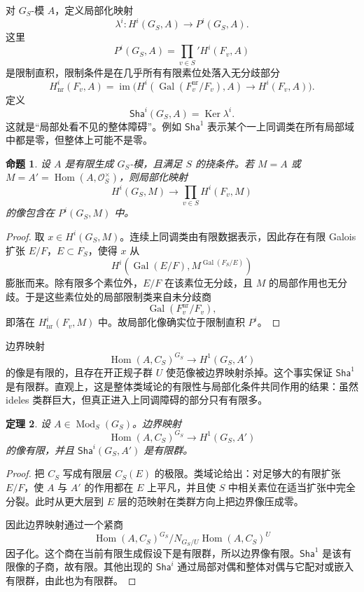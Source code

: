 \documentclass[11pt,a4paper,openany]{ctexbook}
\numberwithin{equation}{chapter}
\newcommand{\Gal}{\operatorname{Gal}}
\newcommand{\Hom}{\operatorname{Hom}}
\newcommand{\Ker}{\operatorname{Ker}}
\newcommand{\Sha}{\mathsf{Sha}}
\theoremstyle{plain}
\newtheorem{theorem}{定理}[chapter]
\newtheorem{proposition}[theorem]{命题}
\theoremstyle{definition}
\theoremstyle{remark}
\begin{document}
对 $G_S$-模 $A$，定义局部化映射
\[
\lambda^i:H^i(G_S,A)\longrightarrow P^i(G_S,A).
\]
这里
\[
P^i(G_S,A)=\prod_{v\in S}' H^i(F_v,A)
\]
是限制直积，限制条件是在几乎所有有限素位处落入无分歧部分
\[
H^i_{\mathrm{nr}}(F_v,A)=\operatorname{im}\bigl(H^i(\Gal(F_v^{\mathrm{nr}}/F_v),A)
\to H^i(F_v,A)\bigr).
\]
定义
\[
\Sha^i(G_S,A)=\Ker\lambda^i.
\]
这就是“局部处看不见的整体障碍”。例如 $\Sha^1$ 表示某个一上同调类在所有局部域中都是零，但整体上可能不是零。

\begin{proposition}
设 $A$ 是有限生成 $G_S$-模，且满足 $S$ 的挠条件。若 $M=A$ 或 $M=A'=\Hom(A,\mathcal O_S^\times)$，则局部化映射
\[
H^i(G_S,M)\longrightarrow \prod_{v\in S}H^i(F_v,M)
\]
的像包含在 $P^i(G_S,M)$ 中。
\end{proposition}

\begin{proof}
取 $x\in H^i(G_S,M)$。连续上同调类由有限数据表示，因此存在有限 Galois 扩张 $E/F$，$E\subset F_S$，使得 $x$ 从
\[
H^i(\Gal(E/F),M^{\Gal(F_S/E)})
\]
膨胀而来。除有限多个素位外，$E/F$ 在该素位无分歧，且 $M$ 的局部作用也无分歧。于是这些素位处的局部限制类来自未分歧商
\[
\Gal(F_v^{\mathrm{nr}}/F_v),
\]
即落在 $H^i_{\mathrm{nr}}(F_v,M)$ 中。故局部化像确实位于限制直积 $P^i$。
\end{proof}

边界映射
\[
\Hom(A,C_S)^{G_S}\longrightarrow H^1(G_S,A')
\]
的像是有限的，且存在开正规子群 $U$ 使范像被边界映射杀掉。这个事实保证 $\Sha^1$ 是有限群。直观上，这是整体类域论的有限性与局部化条件共同作用的结果：虽然 ideles 类群巨大，但真正进入上同调障碍的部分只有有限多。

\begin{theorem}
设 $A\in \operatorname{Mod}_S(G_S)$。边界映射
\[
\Hom(A,C_S)^{G_S}\longrightarrow H^1(G_S,A')
\]
的像有限，并且 $\Sha^i(G_S,A')$ 是有限群。
\end{theorem}

\begin{proof}
把 $C_S$ 写成有限层 $C_S(E)$ 的极限。类域论给出：对足够大的有限扩张 $E/F$，使 $A$ 与 $A'$ 的作用都在 $E$ 上平凡，并且使 $S$ 中相关素位在适当扩张中完全分裂。此时从更大层到 $E$ 层的范映射在类群方向上把边界像压成零。

因此边界映射通过一个紧商
\[
\Hom(A,C_S)^{G_S}/N_{G_S/U}\Hom(A,C_S)^U
\]
因子化。这个商在当前有限生成假设下是有限群，所以边界像有限。$\Sha^1$ 是该有限像的子商，故有限。其他出现的 $\Sha^i$ 通过局部对偶和整体对偶与它配对或嵌入有限群，由此也为有限群。
\end{proof}
\end{document}
